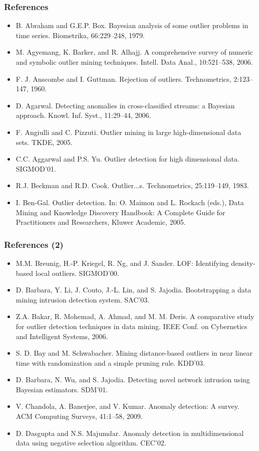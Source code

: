 \documentclass[aspectratio=169,t,xcolor=dvipsnames]{beamer}
\begin{document}
  \begin{frame}
	\frametitle{References}
	\begin{itemize}
		\item B. Abraham and G.E.P. Box. Bayesian analysis of some outlier problems in time series. Biometrika, 66:229–248, 1979.
		\item M. Agyemang, K. Barker, and R. Alhajj. A comprehensive survey of numeric and symbolic outlier mining techniques. Intell. Data Anal., 10:521–538, 2006.
		\item F. J. Anscombe and I. Guttman. Rejection of outliers. Technometrics, 2:123–147, 1960.
		\item D. Agarwal. Detecting anomalies in cross-classified streams: a Bayesian approach. Knowl. Inf. Syst., 11:29–44, 2006.
		\item F. Angiulli and C. Pizzuti. Outlier mining in large high-dimensional data sets. TKDE, 2005.
		\item C.C. Aggarwal and P.S. Yu. Outlier detection for high dimensional data. SIGMOD'01.
		\item R.J. Beckman and R.D. Cook. Outlier...s. Technometrics, 25:119–149, 1983.
		\item I. Ben-Gal. Outlier detection. In: O. Maimon and L. Rockach (eds.), Data Mining and Knowledge Discovery Handbook: A Complete Guide for Practitioners and Researchers, Kluwer Academic, 2005.
	\end{itemize}
\end{frame}

\begin{frame}
	\frametitle{References (2)}
	\begin{itemize}
		\item M.M. Breunig, H.-P. Kriegel, R. Ng, and J. Sander. LOF: Identifying density-based local outliers. SIGMOD'00.
		\item D. Barbara, Y. Li, J. Couto, J.-L. Lin, and S. Jajodia. Bootstrapping a data mining intrusion detection system. SAC'03.
		\item Z.A. Bakar, R. Mohemad, A. Ahmad, and M. M. Deris. A comparative study for outlier detection techniques in data mining. IEEE Conf. on Cybernetics and Intelligent Systems, 2006.
		\item S. D. Bay and M. Schwabacher. Mining distance-based outliers in near linear time with randomization and a simple pruning rule. KDD'03.
		\item D. Barbara, N. Wu, and S. Jajodia. Detecting novel network intrusion using Bayesian estimators. SDM'01.
		\item V. Chandola, A. Banerjee, and V. Kumar. Anomaly detection: A survey. ACM Computing Surveys, 41:1–58, 2009.
		\item D. Dasgupta and N.S. Majumdar. Anomaly detection in multidimensional data using negative selection algorithm. CEC'02.
	\end{itemize}
\end{frame}
\end{document}
